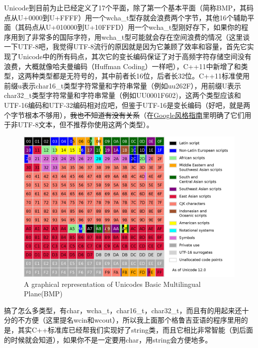 Unicode到目前为止已经定义了17个平面，除了第一个基本平面（简称BMP，其码点从U+0000到U+FFFF）用一个wcha\_t型存就会浪费两个字节，其他16个辅助平面（其码点从U+010000到U+10FFFD）用一个wcha\_t型刚好存下，如果你的程序用到了非常多的国际字符，用wcha\_t型可能就会存在空间浪费的情况（这里谈一下UTF-8吧，我觉得UTF-8流行的原因就是因为它兼顾了效率和容量，首先它实现了Unicode中的所有码点，其次它的变长编码保证了对于高频字符存储空间没有浪费，大概就像哈夫曼编码（Huffman Coding）一样吧），C++11中新增了和类型，这两种类型都是无符号的，其中前者长16位，后者长32位。C++11标准使用前缀u表示char16\_t类型字符常量和字符串常量（例如u\leftqm\mybackslash u262F\rightqm），用前缀U表示char32\_t类型字符常量和字符串常量（例如U\leftqm\mybackslash U0001F602\rightqm)，这两个类型应该和UTF-16编码和UTF-32编码相对应吧，但鉴于UTF-16是变长编码（好吧，就是两个字节根本不够用），\sout{我也不知道有没有关系}（在\href{https://github.com/google/styleguide}{Google风格指南}里明确了它们用于非UTF-8文本，但不推荐你使用这两个类型）。

\begin{figure}[!hbt]
\centering
\includegraphics[scale=0.3]{./Figures/Unicode BMP}
\caption{A graphical representation of Unicode\rightqm s Basic Multilingual Plane(BMP)}
\label{figure:Unicode BMP}
\end{figure}

搞了怎么多类型，有char，wcha\_t，char16\_t，char32\_t，而且有的用起来还十分的不方便（这里提名wcin和wcout），所以我上面那个格鲁吉亚语的程序里用的是，其实C++标准库已经帮我们实现好了string类，而且它相比非常智能（到后面的时候就会知道），如果你不是一定要用char，用string会方便地多。

